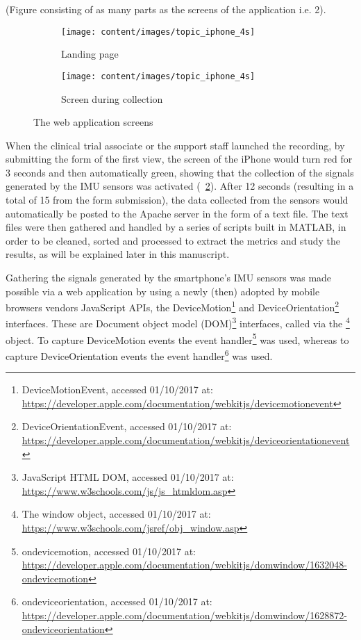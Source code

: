 (\textcolor{BurntOrange}{Figure consisting of as many parts as the screens of the application i.e. 2}). 

\begin{figure}[h]
\centering
\begin{subfigure}{.5\textwidth}
  \centering
  \texttt{[image: content/images/topic\_iphone\_4s]}
  \caption{Landing page}
  \label{fig:webapp1}
\end{subfigure}%
\begin{subfigure}{.5\textwidth}
  \centering
  \texttt{[image: content/images/topic\_iphone\_4s]}
  \caption{Screen during collection}
  \label{fig:webapp2}
\end{subfigure}
\caption{The web application screens}
\label{fig:webapp}
\end{figure}

When the clinical trial associate or the support staff launched the recording, by submitting the form of the first view, the screen of the iPhone would turn red for 3 seconds and then automatically green, showing that the collection of the signals generated by the \gls{IMU} sensors was activated (~\ref{fig:webapp2}). After 12 seconds (resulting in a total of 15 from the form submission), the data collected from the sensors would automatically be posted to the Apache server in the form of a text file. The text files were then gathered and handled by a series of scripts built in MATLAB, in order to be cleaned, sorted and processed to extract the metrics and study the results, as will be explained later in this manuscript. 

Gathering the signals generated by the smartphone's \gls{IMU} sensors was made possible via a web application by using a newly (then) adopted by mobile browsers vendors JavaScript \gls{API}s, the DeviceMotion\footnote{DeviceMotionEvent, accessed 01/10/2017 at: \url{https://developer.apple.com/documentation/webkitjs/devicemotionevent}} and DeviceOrientation\footnote{DeviceOrientationEvent, accessed 01/10/2017 at: \url{https://developer.apple.com/documentation/webkitjs/deviceorientationevent}} interfaces. These are Document object model (\gls{DOM})\footnote{JavaScript HTML DOM, accessed 01/10/2017 at: \url{https://www.w3schools.com/js/js_htmldom.asp}} interfaces, called via the \footnote{The window object, accessed 01/10/2017 at: \url{https://www.w3schools.com/jsref/obj_window.asp}} object. To capture DeviceMotion events the  event handler\footnote{ondevicemotion, accessed 01/10/2017 at: \url{https://developer.apple.com/documentation/webkitjs/domwindow/1632048-ondevicemotion}} was used, whereas to capture DeviceOrientation events the  event handler\footnote{ondeviceorientation, accessed 01/10/2017 at: \url{https://developer.apple.com/documentation/webkitjs/domwindow/1628872-ondeviceorientation}} was used. 

